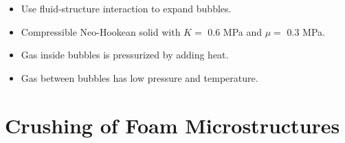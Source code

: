 \documentclass{beamer}
\begin{document}
\begin{frame}
      \hspace{12pt}
      \begin{itemize}[<+-| alert@+>]
        \item Use fluid-structure interaction to expand bubbles.
        \item Compressible Neo-Hookean solid with $K = $ 0.6 MPa and
              $\mu = $ 0.3 MPa.
        \item Gas inside bubbles is pressurized by adding heat.
        \item Gas between bubbles has low pressure and temperature.
      \end{itemize}
    \end{frame}

  \section{Crushing of Foam Microstructures}
\end{document}
